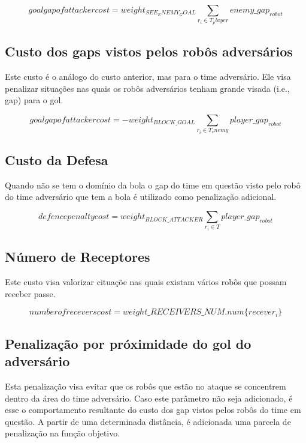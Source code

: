 \begin{dmath}
   goal gap of attacker cost = weight_{SEE_ENEMY_GOAL}
    \sum_{r_i \in T_player} enemy{\_}gap_{robot}
\end{dmath}

\subsection{Custo dos gaps vistos pelos robôs adversários}

Este custo é o análogo do custo anterior, mas para o
time adversário. Ele visa penalizar situações nas quais
os robôs adversários tenham grande visada (i.e., gap)
para o gol. 

\begin{dmath}
   goal gap of attacker cost = - weight_{BLOCK{\_}GOAL}
    \sum_{r_i \in T_enemy} player{\_}gap_{robot}
\end{dmath}

\subsection{Custo da Defesa}
Quando não se tem o domínio da bola o gap do time em questão
visto pelo robô do time adversário que tem a bola é utilizado
como penalização adicional.

\begin{dmath}
  defence penalty cost = weight_{BLOCK{\_}ATTACKER}
   \sum_{r_i \in T} player{\_}gap_{robot}
\end{dmath}

\subsection{Número de Receptores}

Este custo visa valorizar cituaçõe nas quais existam
vários robôs que possam receber passe.

\begin{dmath}
  number of recevers cost = weight{\_}RECEIVERS{\_}NUM . 
   num \lbrace recever_i \rbrace
\end{dmath}

\subsection{Penalização por próximidade do gol do adversário}
Esta penalização visa evitar que os robôs que estão no ataque
se concentrem dentro da área do time adversário. Caso este
parâmetro não seja adicionado, é esse o comportamento resultante
do custo dos gap vistos pelos robôs do time em questão. 
A partir de uma determinada distância, é adicionada uma parcela
de penalização na função objetivo.

